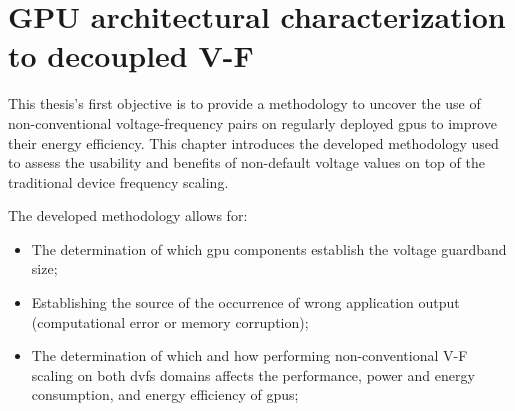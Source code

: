 
\chapter{GPU architectural characterization to decoupled V-F}
\label{chapter:gpu_char}
This thesis's first objective is to provide a methodology to uncover the use of non-conventional voltage-frequency pairs on regularly deployed \acrshort{gpu}s to improve their energy efficiency.
This chapter introduces the developed methodology used to assess the usability and benefits of non-default voltage values on top of the traditional device frequency scaling. 

The developed methodology allows for:
\begin{itemize}
    \item The determination of which \acrshort{gpu} components establish the voltage guardband size;
    \item Establishing the source of the occurrence of wrong application output (computational error or memory corruption);
    \item The determination of which and how performing non-conventional V-F scaling on both \acrshort{dvfs} domains affects the performance, power and energy consumption, and energy efficiency of \acrshort{gpu}s;
\end{itemize}

